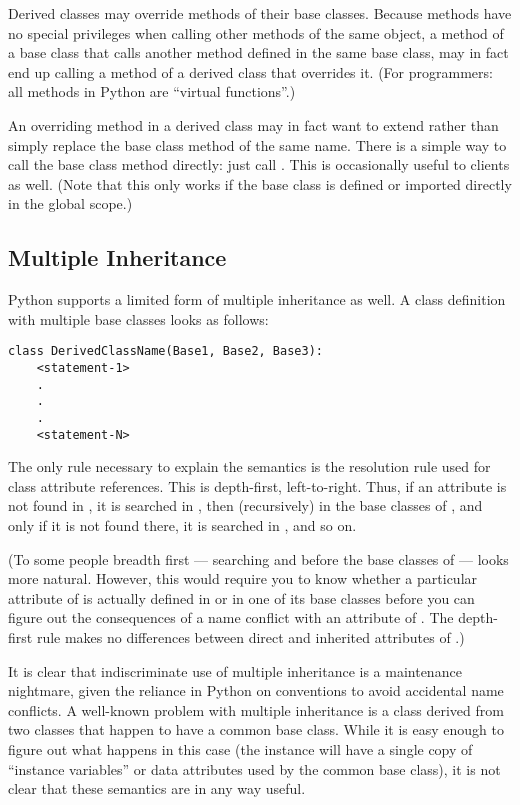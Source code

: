 \documentclass{manual}
\begin{document}
Derived classes may override methods of their base classes.  Because
methods have no special privileges when calling other methods of the
same object, a method of a base class that calls another method
defined in the same base class, may in fact end up calling a method of
a derived class that overrides it.  (For \Cpp{} programmers: all methods
in Python are ``virtual functions''.)

An overriding method in a derived class may in fact want to extend
rather than simply replace the base class method of the same name.
There is a simple way to call the base class method directly: just
call .  This is
occasionally useful to clients as well.  (Note that this only works if
the base class is defined or imported directly in the global scope.)


\subsection{Multiple Inheritance \label{multiple}}

Python supports a limited form of multiple inheritance as well.  A
class definition with multiple base classes looks as follows:

\begin{verbatim}
class DerivedClassName(Base1, Base2, Base3):
    <statement-1>
    .
    .
    .
    <statement-N>
\end{verbatim}

The only rule necessary to explain the semantics is the resolution
rule used for class attribute references.  This is depth-first,
left-to-right.  Thus, if an attribute is not found in
, it is searched in , then
(recursively) in the base classes of , and only if it is
not found there, it is searched in , and so on.

(To some people breadth first --- searching  and
 before the base classes of  --- looks more
natural.  However, this would require you to know whether a particular
attribute of  is actually defined in  or in
one of its base classes before you can figure out the consequences of
a name conflict with an attribute of .  The depth-first
rule makes no differences between direct and inherited attributes of
.)

It is clear that indiscriminate use of multiple inheritance is a
maintenance nightmare, given the reliance in Python on conventions to
avoid accidental name conflicts.  A well-known problem with multiple
inheritance is a class derived from two classes that happen to have a
common base class.  While it is easy enough to figure out what happens
in this case (the instance will have a single copy of ``instance
variables'' or data attributes used by the common base class), it is
not clear that these semantics are in any way useful.
\end{document}

